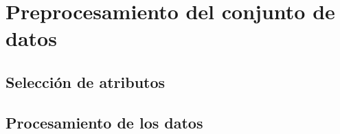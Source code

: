 \chapter{Preprocesamiento del conjunto de datos}

\section{Selección de atributos}

\section{Procesamiento de los datos}